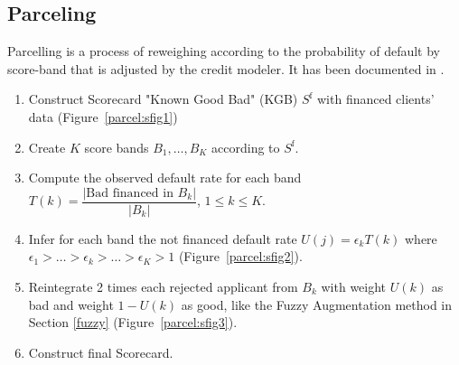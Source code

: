 \subsection{Parceling} \label{Parceling}

Parcelling is a process of reweighing according to the probability of default by score-band that is adjusted by the credit modeler. It has been documented in \cite{saporta,banasik,RI6}.

\begin{enumerate}
\item Construct Scorecard "Known Good Bad" (KGB) $S^{\text{f}}$ with financed clients' data (Figure~\ref{parcel:sfig1})
\item Create $K$ score bands $B_1, \ldots, B_K$ according to $S^{\text{f}}$.
\item Compute the observed default rate for each band $T(k) = \dfrac{|\text{Bad financed in } B_k|}{|B_k|}$, $1 \leq k  \leq K$.
\item Infer for each band the not financed default rate $U(j) = \epsilon_k T(k)$ where $\epsilon_1 > \ldots > \epsilon_k > \ldots > \epsilon_K > 1$ (Figure~\ref{parcel:sfig2}).
\item Reintegrate 2 times each rejected applicant from $B_k$ with weight $U(k)$ as bad and weight $1-U(k)$ as good, like the Fuzzy Augmentation method in Section \ref{fuzzy} (Figure~\ref{parcel:sfig3}).
\item Construct final Scorecard.
\end{enumerate}


